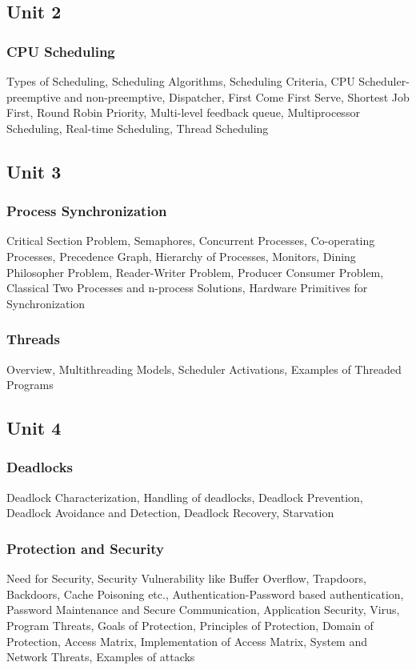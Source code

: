 \documentclass{article}
\begin{document}
\begin{multicols*}{2}
    \subsection*{Unit 2}
    \subsubsection*{CPU Scheduling}
    Types of Scheduling, Scheduling Algorithms, Scheduling Criteria, CPU Scheduler-preemptive and non-preemptive, Dispatcher, First Come First Serve, Shortest Job First, Round Robin Priority, Multi-level feedback queue, Multiprocessor Scheduling, Real-time Scheduling, Thread Scheduling
    \subsection*{Unit 3}
    \subsubsection*{Process Synchronization}
    Critical Section Problem, Semaphores, Concurrent Processes, Co-operating Processes, Precedence Graph, Hierarchy of Processes, Monitors, Dining Philosopher Problem, Reader-Writer Problem, Producer Consumer Problem, Classical Two Processes and n-process Solutions, Hardware Primitives for Synchronization
    \subsubsection*{Threads}
    Overview, Multithreading Models, Scheduler Activations, Examples of Threaded Programs
    \subsection*{Unit 4}
    \subsubsection*{Deadlocks}
    Deadlock Characterization, Handling of deadlocks, Deadlock Prevention, Deadlock Avoidance and Detection, Deadlock Recovery, Starvation
    \subsubsection*{Protection and Security}
    Need for Security, Security Vulnerability like Buffer Overflow, Trapdoors, Backdoors, Cache Poisoning etc., Authentication-Password based authentication, Password Maintenance and Secure Communication, Application Security, Virus, Program Threats, Goals of Protection, Principles of Protection, Domain of Protection, Access Matrix, Implementation of Access Matrix, System and Network Threats, Examples of attacks

\end{multicols*}
\end{document}
